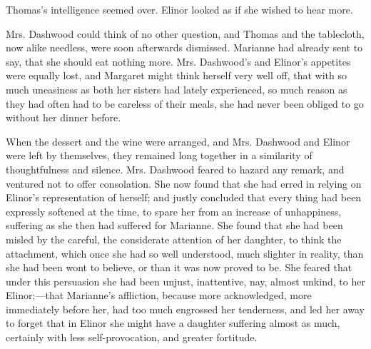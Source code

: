 Thomas's intelligence seemed over. Elinor looked as if she wished to hear more.





Mrs. Dashwood could think of no other question, and Thomas and the tablecloth, now alike needless, were soon afterwards dismissed. Marianne had already sent to say, that she should eat nothing more. Mrs. Dashwood's and Elinor's appetites were equally lost, and Margaret might think herself very well off, that with so much uneasiness as both her sisters had lately experienced, so much reason as they had often had to be careless of their meals, she had never been obliged to go without her dinner before.

When the dessert and the wine were arranged, and Mrs. Dashwood and Elinor were left by themselves, they remained long together in a similarity of thoughtfulness and silence. Mrs. Dashwood feared to hazard any remark, and ventured not to offer consolation. She now found that she had erred in relying on Elinor's representation of herself; and justly concluded that every thing had been expressly softened at the time, to spare her from an increase of unhappiness, suffering as she then had suffered for Marianne. She found that she had been misled by the careful, the considerate attention of her daughter, to think the attachment, which once she had so well understood, much slighter in reality, than she had been wont to believe, or than it was now proved to be. She feared that under this persuasion she had been unjust, inattentive, nay, almost unkind, to her Elinor;---that Marianne's affliction, because more acknowledged, more immediately before her, had too much engrossed her tenderness, and led her away to forget that in Elinor she might have a daughter suffering almost as much, certainly with less self-provocation, and greater fortitude.

\chapter{} %

